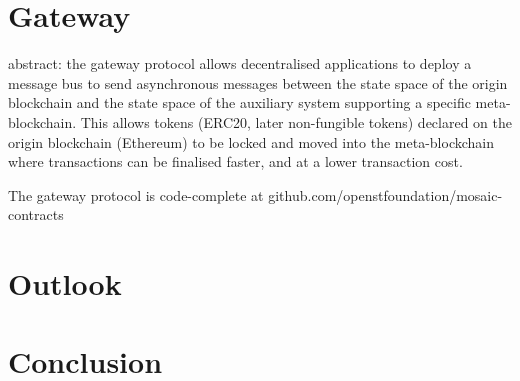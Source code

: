 \documentclass[12pt,a4paper]{article}
\begin{document}

\section{Gateway}

abstract: the gateway protocol allows decentralised applications to deploy a message bus to send asynchronous messages between the state space of the origin blockchain and the state space of the auxiliary system supporting a specific meta-blockchain.  This allows tokens (ERC20, later non-fungible tokens) declared on the origin blockchain (Ethereum) to be locked and moved into the meta-blockchain where transactions can be finalised faster, and at a lower transaction cost. 

The gateway protocol is code-complete at github.com/openstfoundation/mosaic-contracts

%
%
\section{Outlook}

%
%
\section{Conclusion}







\end{document}
